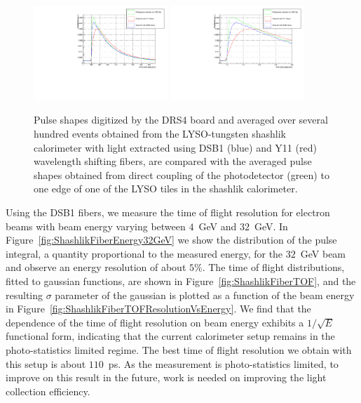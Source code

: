 \documentclass[11pt]{article}
\begin{document}
\begin{figure}[h] \centering
\includegraphics[width=0.45\textwidth]{figs/FiberPulses} 
\includegraphics[width=0.45\textwidth]{figs/FiberPulsesZoom} 
\caption{ Pulse shapes digitized by the DRS4 board and averaged over several hundred events 
obtained from the LYSO-tungsten shashlik calorimeter with light extracted using
DSB1 (blue) and Y11 (red) wavelength shifting fibers, are compared with 
the averaged pulse shapes obtained from direct coupling of the photodetector (green)
to one edge of one of the LYSO tiles in the shashlik calorimeter.} 
\label{fig:FiberPulseComparison}
\end{figure}


Using the DSB1 fibers, we measure the time of flight resolution
for electron beams with beam energy varying between $4$~GeV and $32$~GeV.
In Figure~\ref{fig:ShashlikFiberEnergy32GeV} we show the distribution
of the pulse integral, a quantity proportional to the measured energy,
for the $32$~GeV beam and observe an energy resolution of about $5\%$.
The time of flight distributions, fitted to gaussian functions,
are shown in Figure~\ref{fig:ShashlikFiberTOF}, and the resulting
$\sigma$ parameter of the gaussian is plotted as a function of the
beam energy in Figure~\ref{fig:ShashlikFiberTOFResolutionVsEnergy}.
We find that the dependence of the time of flight resolution on
beam energy exhibits a $1/\sqrt{E}$ functional form, indicating
that the current calorimeter setup remains in the photo-statistics
limited regime. The best time of flight resolution we obtain
with this setup is about $110$~ps. As the measurement is photo-statistics
limited, to improve on this result in the future, work is needed
on improving the light collection efficiency. 
\end{document}
